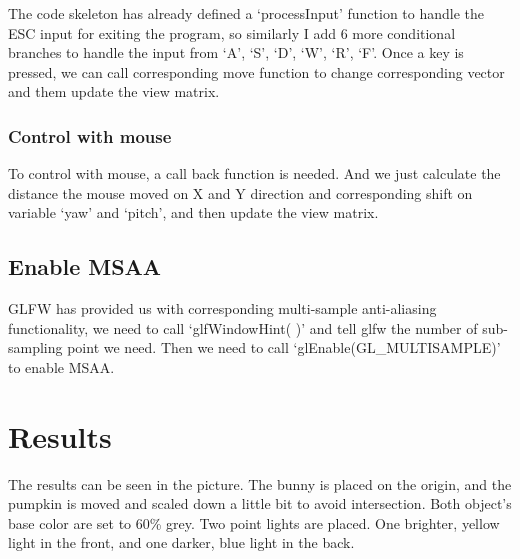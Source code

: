 \documentclass[acmtog]{acmart}
\begin{document}
The code skeleton has already defined a `processInput' function to handle the ESC input for exiting the program, so similarly I add 6 more conditional branches to handle the input from `A', `S', `D', `W', `R', `F'. Once a key is pressed, we can call corresponding move function to change corresponding vector and them update the view matrix.

\subsubsection{Control with mouse}
To control with mouse, a call back function is needed. And we just calculate the distance the mouse moved on X and Y direction and corresponding shift on variable `yaw' and `pitch', and then update the view matrix.


\subsection{Enable MSAA}
GLFW has provided us with corresponding multi-sample anti-aliasing functionality, we need to call `glfWindowHint( )' and tell glfw the number of sub-sampling point we need. Then we need to call `glEnable(GL\_MULTISAMPLE)' to enable MSAA.

\section{Results}
The results can be seen in the picture. The bunny is placed on the origin, and the pumpkin is moved and scaled down a little bit to avoid intersection. Both object's base color are set to 60\% grey. Two point lights are placed. One brighter, yellow light in the front, and one darker, blue light in the back.
\end{document}
